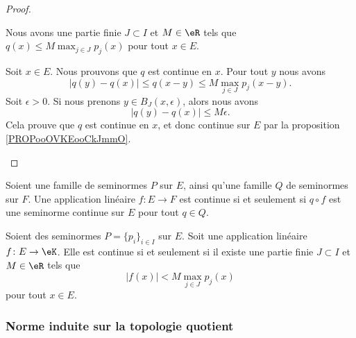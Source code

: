 \begin{proof}
\begin{subproof}
		\spitem[\ref{ITEMooBBNCooGwHrUI} \( \Rightarrow\) \ref{ITEMooHKNYooARXiXs}]

		Nous avons une partie finie \( J\subset I\) et \( M\in \eR\) tels que \( q(x)\leq M\max_{j\in J}p_j(x)\) pour tout \( x\in E\).

		Soit \( x\in E\). Nous prouvons que \( q\) est continue en \( x\). Pour tout \( y\) nous avons
		\begin{equation}
			| q(y)-q(x) |\leq q(x-y)\leq M\max_{j\in J}p_j(x-y).
		\end{equation}
		Soit \( \epsilon>0\). Si nous prenons \( y\in B_J(x,\epsilon)\), alors nous avons
		\begin{equation}
			| q(y)-q(x) |\leq M\epsilon.
		\end{equation}
		Cela prouve que \( q\) est continue en \( x\), et donc continue sur \( E\) par la proposition \ref{PROPooOVKEooCkJmmO}.
	\end{subproof}
\end{proof}

\begin{corollary}		\label{CORooSLUCooRaZyYK}
	Soient une famille de seminormes \( P\) sur \( E\), ainsi qu'une famille \( Q\) de seminormes sur \( F\). Une application linéaire \(f \colon E\to F  \) est continue si et seulement si \( q\circ f\) est une seminorme continue sur \( E\) pour tout \( q\in Q\).
\end{corollary}

\begin{corollary}	\label{CORooGMVHooNgYOaY}
	Soient des seminormes \( P=\{ p_i \}_{i\in I}\) sur \( E\). Soit une application linéaire \(f \colon E\to \eK  \). Elle est continue si et seulement si il existe une partie finie \( J\subset I\) et \( M\in \eR\) tels que
	\begin{equation}
		| f(x) |<M\max_{j\in J}p_j(x)
	\end{equation}
	pour tout \( x\in E\).
\end{corollary}

\subsubsection{Norme induite sur la topologie quotient}

